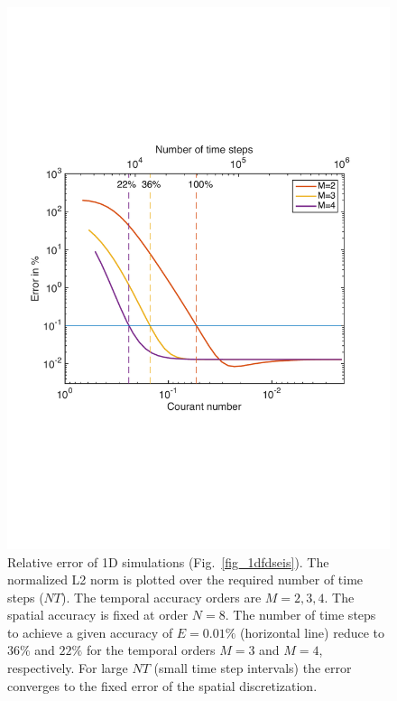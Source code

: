 \begin{figure}[h]
\centering
    \includegraphics[scale=0.7]{figures/error_1D_courant}
    \caption{Relative error of 1D simulations (Fig.~\ref{fig_1dfdseis}). The normalized L2 norm is plotted over the required number of time steps ($NT$). The temporal accuracy orders are $M=2,3,4$. The spatial accuracy is fixed at order $N=8$. The number of time steps to achieve a given accuracy of $E=0.01\%$ (horizontal line) reduce to $36\%$ and $22\%$ for the temporal orders $M=3$ and $M=4$, respectively. For large $NT$ (small time step intervals) the error converges to the fixed error of the spatial discretization.}
    \label{fig_L2}
\end{figure}

